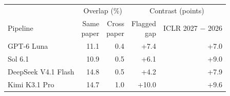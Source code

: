 \begin{tabular*}{\columnwidth}{@{\extracolsep{\fill}}lrrrr@{}}
\toprule
 & \multicolumn{2}{c}{Overlap (\%)} & \multicolumn{2}{c}{Contrast (points)} \\
\cmidrule(lr){2-3}\cmidrule(l){4-5}
Pipeline & \shortstack[r]{Same\\paper} & \shortstack[r]{Cross\\paper} & \shortstack[r]{Flagged\\gap} & \shortstack[r]{ICLR 2027\\$-$ 2026} \\
\midrule
GPT-6 Luna & 11.1 & 0.4 & +7.4 & +7.0 \\
Sol 6.1 & 10.9 & 0.5 & +6.1 & +9.0 \\
DeepSeek V4.1 Flash & 14.8 & 0.5 & +4.2 & +7.9 \\
Kimi K3.1 Pro & 14.7 & 1.0 & +10.0 & +9.6 \\
\bottomrule
\end{tabular*}
